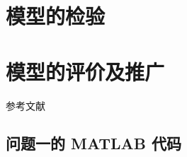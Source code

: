 \documentclass{JXUSTmodeling}
\begin{document}
\section{模型的检验}\label{sec:6}

\section{模型的评价及推广}\label{sec:7}

\begin{thebibliography}{99}
  参考文献
\end{thebibliography}

\begin{appendixx}
  \section{问题一的 MATLAB 代码}
\end{appendixx}
\end{document}
